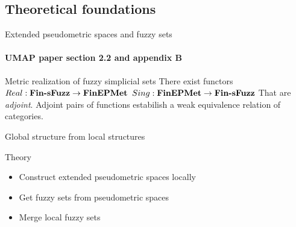 \documentclass[unknownkeysallowed]{beamer}
\begin{document}
\subsection{Theoretical foundations}
\begin{frame}{Extended pseudometric spaces and fuzzy sets}
\framesubtitle{UMAP paper section 2.2 and appendix B}

\begin{block}{Metric realization of fuzzy simplicial sets}
There exist functors
\break
$Real: \textrm{\textbf{Fin-sFuzz}} \to \textrm{\textbf{FinEPMet}}$
\break
$Sing: \textrm{\textbf{FinEPMet}} \to \textrm{\textbf{Fin-sFuzz}}$
\break
That are \textit{adjoint}.
\break
Adjoint pairs of functions estabilish a weak equivalence relation of categories.
\end{block}

\end{frame}


\begin{frame}{Global structure from local structures}

	\begin{block}{Theory}

	\begin{itemize}
		\item Construct extended pseudometric spaces locally
		\item Get fuzzy sets from pseudometric spaces
		\item Merge local fuzzy sets
	\end{itemize}

	\end{block}

\end{frame}
\end{document}
